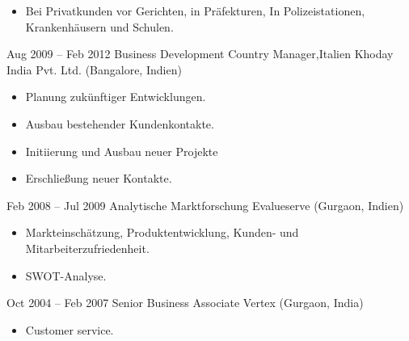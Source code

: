 \documentclass[a4paper,]{fortysecondscv}
\begin{document}
\begin{cvtable}[4]
{\begin{itemize}[nosep, leftmargin=0pt]
					\item Bei Privatkunden vor Gerichten, in Präfekturen, In Polizeistationen, Krankenhäusern und Schulen.
				\end{itemize}
			}
		\cvitem
			{Aug 2009 -- Feb 2012}
			{Business Development Country Manager,Italien}
			{Khoday India Pvt. Ltd. (Bangalore, Indien)}
			{
				\begin{itemize}[nosep, leftmargin=0pt] %
					\item Planung zukünftiger Entwicklungen.
					\item Ausbau bestehender Kundenkontakte.
					\item Initiierung und Ausbau neuer Projekte
					\item Erschließung neuer Kontakte.
				\end{itemize}
			}
		\cvitem
			{Feb 2008 -- Jul 2009}
			{Analytische Marktforschung}
			{Evalueserve (Gurgaon, Indien)}
			{
				\vspace{-\topsep}
				\begin{itemize}[nosep, leftmargin=0pt] %
					\item Markteinschätzung, Produktentwicklung, Kunden- und Mitarbeiterzufriedenheit.
					\item SWOT-Analyse.
				\end{itemize}
			}
		\cvitem
			{Oct 2004 -- Feb 2007}
			{Senior Business Associate}
			{Vertex (Gurgaon, India)}
			{ 
				\vspace{-\topsep}
				\begin{itemize}[nosep, leftmargin=0pt] %
					\item Customer service.
				\end{itemize}
			}
	\end{cvtable}





\newpage
\makebacksidebar
\end{document}
